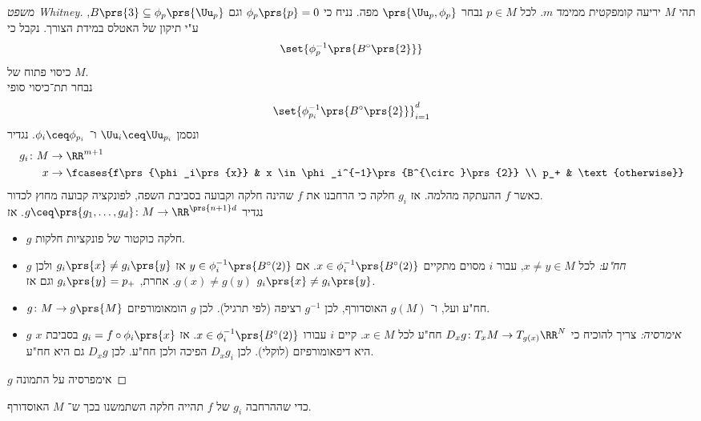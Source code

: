 \documentclass[a4paper,10pt,twoside,openany]{book}
\begin{document}
\begin{proof}[משפט \textenglish{Whitney}]
תהי
$M$
יריעה קומפקטית
ממימד
$m$.
לכל
$p \in M$
נבחר
$\prs{\Uu_p, \phi_p}$
מפה.
נניח כי
$\phi_p\prs{p} = 0$
וגם
$B\prs{3} \subseteq \phi_p\prs{\Uu_p}$,
ע"י תיקון של האטלס במידת הצורך. נקבל כי
\[\set{\phi^{-1}_p \prs{B^{\circ}\prs{2}}}\]
כיסוי פתוח של
$M$.\\
נבחר תת־כיסוי סופי
\[\set{\phi^{-1}_{p_i} \prs{B^{\circ}\prs{2}}}_{i=1}^d\]
ונסמן
$\Uu_i \ceq \Uu_{p_i}$
ו־%
$\phi_i \ceq \phi_{p_i}$.
נגדיר
\begin{align*}
g_i \colon M &\to \RR^{m+1} \\
x &\to \fcases{f\prs{\phi_i\prs{x}} & x \in \phi_i^{-1}\prs{B^{\circ}\prs{2}} \\ p_+ & \text{otherwise}}
\end{align*}
כאשר
$f$
ההעתקה מהלמה.
אז
$g_i$
חלקה כי הרחבנו את
$f$
שהינה חלקה וקבועה בסביבת השפה, לפונקציה קבועה מחוץ לכדור.\\
נגדיר
$g \ceq \prs{g_1, \ldots, g_d} \colon M \to \RR^{\prs{n+1}d}$.
אז
\begin{itemize}
\item
$g$
חלקה כוקטור של פונקציות חלקות.
\item \emph{$g$ חח"ע:}
לכל
$x \neq y \in M$,
עבור
$i$
מסוים מתקיים
$x \in \phi^{-1}_i \prs{B^{\circ}(2)}$.
אם
$y \in\phi^{-1}_i \prs{B^{\circ}(2)}$
אז
$g_i\prs{x} \neq g_i \prs{y}$
ולכן
$g(x) \neq g(y)$.
אחרת,
$g_i\prs{y} = p_+$
וגם אז
$g_i\prs{x} \neq g_i\prs{y}$.
\item
$g \colon M \to g\prs{M}$
חח"ע ועל, ו־%
$g(M)$
האוסדורף, לכן
$g^{-1}$
רציפה (לפי תרגיל). לכן
$g$
הומאומורפיזם.
\item \emph{$g$ אימרסיה:}
צריך להוכיח כי
$D_x g \colon T_x M \to T_{g(x)}\RR^N$
חח"ע לכל
$x \in M$.
קיים
$i$
עבורו
$x \in \phi_i^{-1}\prs{B^{\circ}(2)}$.
אז
$g_i = f\circ \phi_i\prs{x}$
בסביבת
$x$
היא דיפאומורפיזם (לוקלי). לכן
$D_x g_i$
הפיכה ולכן חח"ע. לכן
$D_x g$
גם היא חח"ע.
\end{itemize}
$g$
אימפרסיה על התמונה
\end{proof}
\begin{remark}
כדי שההרחבה
$g_i$
של
$f$
תהייה חלקה השתמשנו בכך ש־%
$M$
האוסדורף.
\end{remark}
\end{document}
